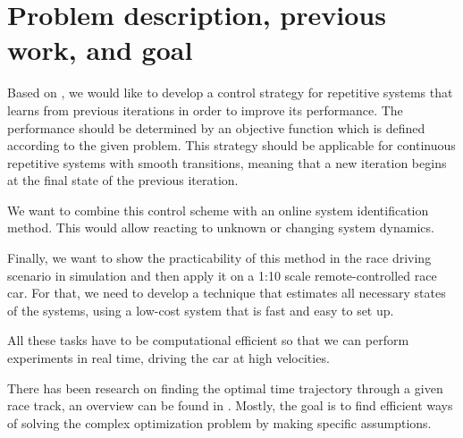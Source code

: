 \section{Problem description, previous work, and goal}
Based on \cite{Rosolia2016}, we would like to develop a control strategy for repetitive systems that learns from previous iterations in order to improve its performance. The performance should be determined by an objective function which is defined according to the given problem. This strategy should be applicable for continuous repetitive systems with smooth transitions, meaning that a new iteration begins at the final state of the previous iteration.

We want to combine this control scheme with an online system identification method. This would allow reacting to unknown or changing system dynamics.

Finally, we want to show the practicability of this method in the race driving scenario in simulation and then apply it on a 1:10 scale remote-controlled race car. For that, we need to develop a technique that estimates all necessary states of the systems, using a low-cost system that is fast and easy to set up.

All these tasks have to be computational efficient so that we can perform experiments in real time, driving the car at high velocities.

There has been research on finding the optimal time trajectory through a given race track, an overview can be found in \cite{Sharp2011}. Mostly, the goal is to find efficient ways of solving the complex optimization problem by making specific assumptions.

